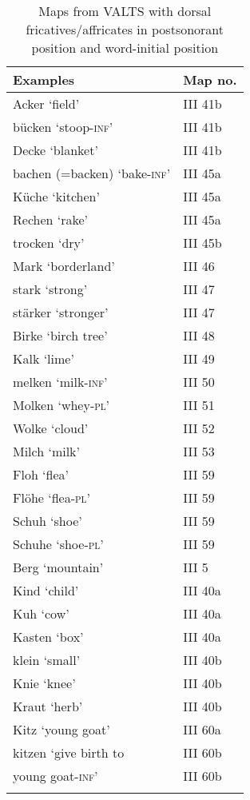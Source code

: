 \begin{table}
\caption{Maps from VALTS with dorsal fricatives/affricates in postsonorant position and word-initial position}
\label{tab:15.3}
\begin{tabular}{ll}
\lsptoprule
Examples & Map no.\\\midrule
Acker ‘field’ & III 41b\\
bücken ‘stoop-\textsc{inf}’ & III 41b\\
Decke ‘blanket’ & III 41b\\
bachen (=backen) ‘bake-\textsc{inf}’ & III 45a\\
Küche ‘kitchen’                      & III 45a\\
Rechen ‘rake’                        & III 45a\\
trocken ‘dry’ & III 45b\\
Mark ‘borderland’ & III 46\\
stark ‘strong’      & III 47\\
stärker ‘stronger’  & III 47\\
Birke ‘birch tree’ & III 48\\
Kalk ‘lime’ & III 49\\
melken ‘milk-\textsc{inf}’ & III 50\\
Molken ‘whey-\textsc{pl}’ & III 51\\
Wolke ‘cloud’ & III 52\\
Milch ‘milk’ & III 53\\
Floh ‘flea’    & III 59\\
Flöhe ‘flea-\textsc{pl}’  & III 59\\
Schuh ‘shoe’   & III 59\\
Schuhe ‘shoe-\textsc{pl}’ & III 59\\
Berg ‘mountain’ & III 5\\
Kind ‘child’ & III 40a\\
Kuh ‘cow’& III 40a\\
Kasten ‘box’ & III 40a\\
klein ‘small’ & III 40b\\
Knie ‘knee’ & III 40b\\
Kraut ‘herb’ & III 40b\\
Kitz ‘young goat’ & III 60a\\
kitzen ‘give birth to & III 60b\\
young goat-\textsc{inf}’ & III 60b\\
\lspbottomrule
\end{tabular}
\end{table}

